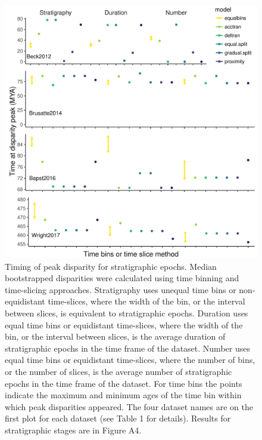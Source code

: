 \documentclass[12pt,a4paper]{article}
\begin{document}
\begin{figure}[!htbp]
    \centering
   \includegraphics[width=1\linewidth, height=1\textheight, keepaspectratio]{figures/fig-peaks-epoch-appendix-revision.pdf}
    \caption[Timing of peak disparity for four example datasets.]
    {Timing of peak disparity for stratigraphic epochs.
    Median bootstrapped disparities were calculated using time binning and time-slicing approaches. 
    Stratigraphy uses unequal time bins or non-equidistant time-slices, where the width of the bin, or the interval between slices, is equivalent to stratigraphic epochs. 
    Duration uses equal time bins or equidistant time-slices, where the width of the bin, or the interval between slices, is the average duration of stratigraphic epochs in the time frame of the dataset. 
    Number uses equal time bins or equidistant time-slices, where the number of bins, or the number of slices, is the average number of stratigraphic epochs in the time frame of the dataset. 
    For time bins the points indicate the maximum and minimum ages of the time bin within which peak disparities appeared.
    The four dataset names are on the first plot for each dataset (see Table 1 for details).
    Results for stratigraphic stages are in Figure A4.}
    \label{figure:peak2}
  \end{figure}
\end{document}

